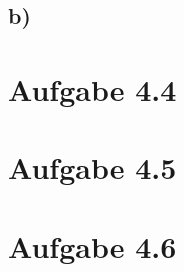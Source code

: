 \documentclass{article}
\begin{document}
\subsection*{b)}

\section*{Aufgabe 4.4}

\section*{Aufgabe 4.5}

\section*{Aufgabe 4.6}
\end{document}
